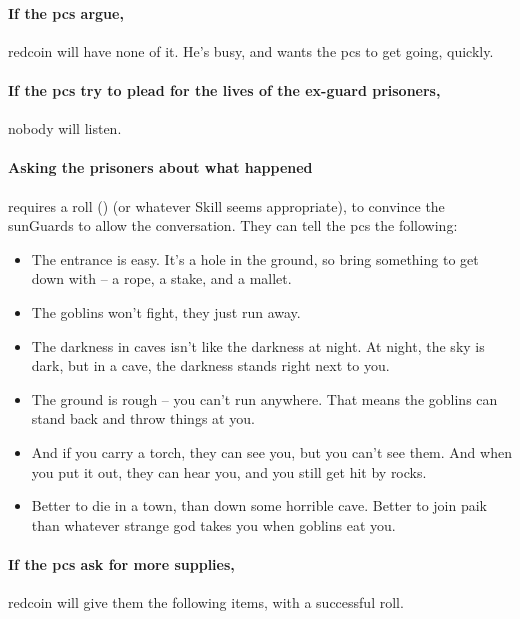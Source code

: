 \begin{multicols}{2}

\paragraph{If the \glspl{pc} argue,}
\gls{redcoin} will have none of it.
He's busy, and wants the \glspl{pc} to get going, quickly.

\paragraph{If the \glspl{pc} try to plead for the lives of the ex-\gls{guard} prisoners,}
nobody will listen.

\paragraph{Asking the prisoners about what happened}
requires a  roll (\tn[8]) (or whatever Skill seems appropriate), to convince the \glspl{sunGuard} to allow the conversation.
They can tell the \glspl{pc} the following:

\begin{itemize}
  \it
  \item
  The entrance is easy.
  It's a hole in the ground, so bring something to get down with -- a rope, a stake, and a mallet.
  \item
  The goblins won't fight, they just run away.
  \item
  The darkness in caves isn't like the darkness at night.
  At night, the sky is dark, but in a cave, the darkness stands right next to you.
  \item
  The ground is rough -- you can't run anywhere.
  That means the goblins can stand back and throw things at you.
  \item
  And if you carry a torch, they can see you, but you can't see them.
  And when you put it out, they can hear you, and you still get hit by rocks.
  \item
  Better to die in a town, than down some horrible cave.
  Better to join \gls{paik} than whatever strange god takes you when goblins eat you.
\end{itemize}

\paragraph{If the \glspl{pc} ask for more supplies,}
\gls{redcoin} will give them the following items, with a successful  roll.


\end{multicols}
